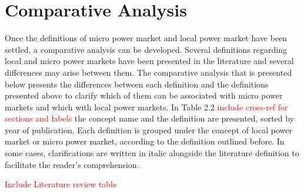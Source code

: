 \section{Comparative Analysis}
Once the definitions of micro power market and local power market have been settled, a comparative analysis can be developed. Several definitions regarding local and micro power markets have been presented in the literature and several differences may arise between them. The comparative analysis that is presented below presents the differences between each definition and the definitions presented above to clarify which of them can be associated with micro power markets and which with local power markets. In Table 2.2 \textcolor{red}{include cross-ref for sections and labels} the
concept name and the definition are presented, sorted by year of publication. Each definition is grouped under the concept of local power market or micro power market, according to the definition outlined before. In some cases, clarifications are written in italic alongside the literature definition to facilitate the reader's comprehension.

\textcolor{red}{Include Literature review table}

